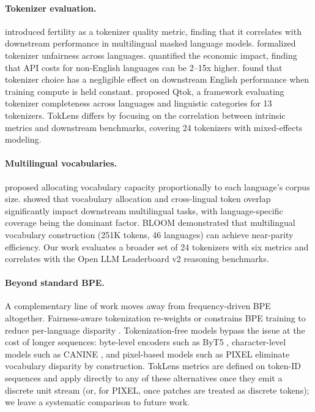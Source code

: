 \documentclass[11pt]{article}
\begin{document}
\paragraph{Tokenizer evaluation.} \citet{rust-etal-2021-good} introduced fertility as a tokenizer quality metric, finding that it correlates with downstream performance in multilingual masked language models. \citet{petrov-etal-2024-language} formalized tokenizer unfairness across languages. \citet{ahia-etal-2023-languages} quantified the economic impact, finding that API costs for non-English languages can be 2--15x higher. \citet{ali2024tokenizer} found that tokenizer choice has a negligible effect on downstream English performance when training compute is held constant. \citet{chelombitko2024qtok} proposed Qtok, a framework evaluating tokenizer completeness across languages and linguistic categories for 13 tokenizers. TokLens differs by focusing on the correlation between intrinsic metrics and downstream benchmarks, covering 24 tokenizers with mixed-effects modeling.

\paragraph{Multilingual vocabularies.} \citet{liang-etal-2023-xlm} proposed allocating vocabulary capacity proportionally to each language's corpus size. \citet{limisiewicz-etal-2023-tokenization} showed that vocabulary allocation and cross-lingual token overlap significantly impact downstream multilingual tasks, with language-specific coverage being the dominant factor. BLOOM \citep{workshop2023bloom} demonstrated that multilingual vocabulary construction (251K tokens, 46 languages) can achieve near-parity efficiency. Our work evaluates a broader set of 24 tokenizers with six metrics and correlates with the Open LLM Leaderboard v2 reasoning benchmarks.

\paragraph{Beyond standard BPE.} A complementary line of work moves away from frequency-driven BPE altogether. Fairness-aware tokenization re-weights or constrains BPE training to reduce per-language disparity \citep{petrov-etal-2024-language, ahia-etal-2023-languages, limisiewicz-etal-2023-tokenization}. Tokenization-free models bypass the issue at the cost of longer sequences: byte-level encoders such as ByT5 \citep{xue2022byt5}, character-level models such as CANINE \citep{clark-etal-2022-canine}, and pixel-based models such as PIXEL \citep{rust2023pixel} eliminate vocabulary disparity by construction. TokLens metrics are defined on token-ID sequences and apply directly to any of these alternatives once they emit a discrete unit stream (or, for PIXEL, once patches are treated as discrete tokens); we leave a systematic comparison to future work.
\end{document}
